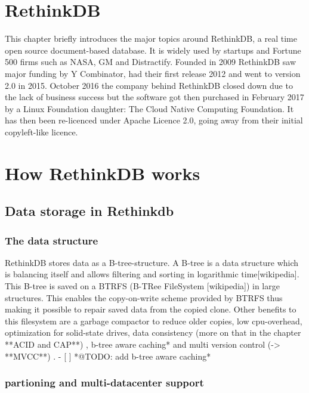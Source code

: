 \section{RethinkDB}

This chapter briefly introduces the major topics around RethinkDB, a real time open source document-based database. It is widely used by startups and Fortune 500 firms such as NASA, GM and Distractify. Founded in 2009 RethinkDB saw major funding by Y Combinator, had their first release 2012 and went to version 2.0 in 2015. October 2016 the company behind RethinkDB closed down due to the lack of business success but the software got then purchased in February 2017 by a Linux Foundation daughter: The Cloud Native Computing Foundation. It has then been re-licenced under Apache Licence 2.0, going away from their initial copyleft-like licence.   

\section{How RethinkDB works}

\subsection{Data storage in Rethinkdb}

\subsubsection{The data structure}

RethinkDB stores data as a B-tree-structure. A B-tree is a data structure which is balancing itself and allows filtering and sorting in logarithmic time[wikipedia]. This B-tree is saved on a BTRFS (B-TRee FileSystem [wikipedia]) in large structures. This enables the copy-on-write scheme provided by BTRFS thus making it possible to repair saved data from the copied clone. Other benefits to this filesystem are a garbage compactor to reduce older copies, low cpu-overhead, optimization for solid-state drives, data consistency (more on that in the chapter **ACID and CAP**) , b-tree aware caching* and multi version control (-> **MVCC**) .
- [ ] *@TODO: add b-tree aware caching*

\subsubsection{partioning and multi-datacenter support}

